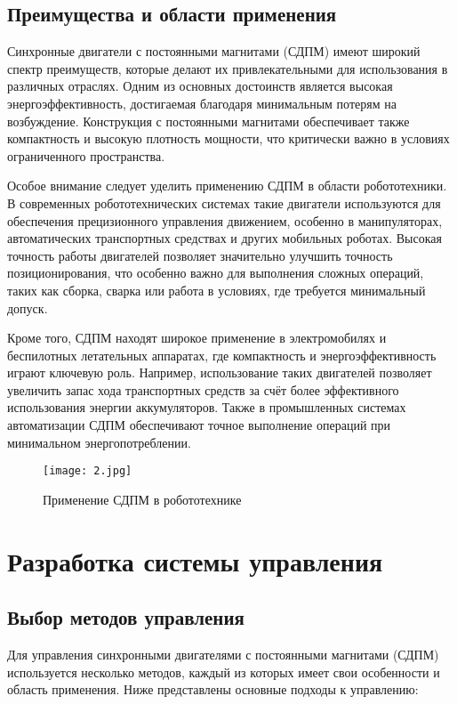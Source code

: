 \documentclass[a4paper,14pt]{extarticle} %
\begin{document}
\subsection*{Преимущества и области применения}

Синхронные двигатели с постоянными магнитами (СДПМ) имеют широкий спектр преимуществ, которые делают их привлекательными для использования в различных отраслях. Одним из основных достоинств является высокая энергоэффективность, достигаемая благодаря минимальным потерям на возбуждение. Конструкция с постоянными магнитами обеспечивает также компактность и высокую плотность мощности, что критически важно в условиях ограниченного пространства.

Особое внимание следует уделить применению СДПМ в области робототехники. В современных робототехнических системах такие двигатели используются для обеспечения прецизионного управления движением, особенно в манипуляторах, автоматических транспортных средствах и других мобильных роботах. Высокая точность работы двигателей позволяет значительно улучшить точность позиционирования, что особенно важно для выполнения сложных операций, таких как сборка, сварка или работа в условиях, где требуется минимальный допуск.

Кроме того, СДПМ находят широкое применение в электромобилях и беспилотных летательных аппаратах, где компактность и энергоэффективность играют ключевую роль. Например, использование таких двигателей позволяет увеличить запас хода транспортных средств за счёт более эффективного использования энергии аккумуляторов. Также в промышленных системах автоматизации СДПМ обеспечивают точное выполнение операций при минимальном энергопотреблении.

\begin{figure}[h]
    \centering
    \texttt{[image: 2.jpg]}
    \caption{Применение СДПМ в робототехнике}
    \label{fig:mpr}
\end{figure}

\section*{Разработка системы управления}

\subsection*{Выбор методов управления}

Для управления синхронными двигателями с постоянными магнитами (СДПМ) используется несколько методов, каждый из которых имеет свои особенности и область применения. Ниже представлены основные подходы к управлению:
\end{document}
